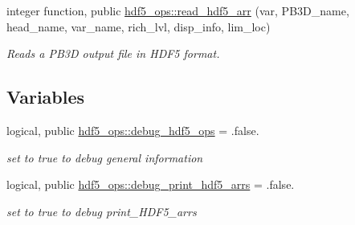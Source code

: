 \begin{DoxyCompactItemize}
integer function, public \hyperlink{namespacehdf5__ops_a5108e0d6f6b492cb981505ebceedd9ee}{hdf5\+\_\+ops\+::read\+\_\+hdf5\+\_\+arr} (var, P\+B3\+D\+\_\+name, head\+\_\+name, var\+\_\+name, rich\+\_\+lvl, disp\+\_\+info, lim\+\_\+loc)
\begin{DoxyCompactList}\small\item\em Reads a P\+B3D output file in H\+D\+F5 format. \end{DoxyCompactList}\end{DoxyCompactItemize}
\subsection*{Variables}
\begin{DoxyCompactItemize}
\item 
logical, public \hyperlink{namespacehdf5__ops_a9b7c63811a63e9454539f1a2c89678b4}{hdf5\+\_\+ops\+::debug\+\_\+hdf5\+\_\+ops} = .false.
\begin{DoxyCompactList}\small\item\em set to true to debug general information \end{DoxyCompactList}\item 
logical, public \hyperlink{namespacehdf5__ops_a00bbaa77652e040350c9726668cc22ac}{hdf5\+\_\+ops\+::debug\+\_\+print\+\_\+hdf5\+\_\+arrs} = .false.
\begin{DoxyCompactList}\small\item\em set to true to debug print\+\_\+\+H\+D\+F5\+\_\+arrs \end{DoxyCompactList}\end{DoxyCompactItemize}
